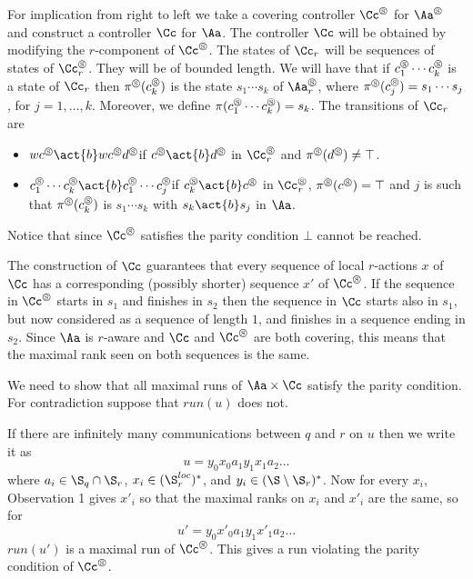 \documentclass[10pt,a4paper]{article}
\newcommand{\run}{\mathit{run}}
\newcommand{\short}[1]{#1^\circledS}
\newcommand{\Sloc}{\S^{loc}}
\begin{document}
  For implication from right to left we take a covering controller $\short \Cc$
  for $\short\Aa$ and construct a controller $\Cc$ for $\Aa$. The
  controller $\Cc$ will be obtained by modifying the $r$-component of
  $\short \Cc$.  The states of $\Cc_r$ will be sequences of states
  of $\short\Cc_r$. They will be of bounded length. We will have that
  if $\short c_1\cdots \short c_k$ is a state of $\Cc_r$ then
  $\short\pi(\short c_k)$ is the state $s_1\cdots s_k$ of $\short\Aa_r$,
  where  $\short\pi(\short c_j)=s_1\cdots
  s_j$, for $j=1,\dots,k$. Moreover, we define $\pi(\short c_1 \cdots
  \short c_k)=s_k$. The transitions of $\Cc_r$ are
  \begin{itemize}
  \item $w\short c \act{b} w\short c \short d $\quad if $\short
    c \act{b} \short d$ in $\short\Cc_r$ and $\short \pi(\short d)\not=\top$. 
  \item $\short c_1\cdots \short c_k \act{b} \short c_1\cdots \short
    c_j$\quad if $\short c_k\act{b}\short c$ in $\short\Cc_r$, $\short
    \pi(\short c)=\top$ and $j$ is such that $\short\pi(\short c_k)$ is
    $s_1\cdots s_k$ with  $s_k\act{b} s_j$ in $\Aa$. 
  \end{itemize}
  Notice that since $\short\Cc$ satisfies the parity condition $\bot$
  cannot be reached.

\medskip

\begin{remark}
The construction of $\Cc$ guarantees that
  every sequence of local $r$-actions $x$ of $\Cc$ has a corresponding
  (possibly shorter) sequence $x'$ of $\short \Cc$. If the sequence in
  $\short\Cc$ starts in $s_1$ and finishes in $s_2$ then the sequence
  in $\Cc$ starts also in $s_1$, but now considered as a sequence of
  length $1$, and finishes in a sequence ending in $s_2$. Since $\Aa$
  is $r$-aware and $\Cc$ and $\short \Cc$ are both covering, this
  means that the maximal rank seen on both sequences is the same.
  
\end{remark}

  We need to show that all maximal runs of $\Aa\times\Cc$ satisfy the
  parity condition. For contradiction suppose that $\run(u)$ does not.

  If there are infinitely many communications between $q$ and $r$ on
  $u$ then we write it as
 \begin{equation}u=y_0x_0a_1y_1x_1a_2\dots
  \end{equation}
  where $a_i\in \S_q \cap \S_r$, $x_i\in (\Sloc_r)^*$, and $y_i\in (\S
  \setminus \S_r)^*$. Now for every $x_i$, Observation 1 gives $x'_i$
  so that the maximal ranks on $x_i$ and $x'_i$ are the same, so for
  \begin{equation}u'=y_0x'_0a_1y_1x'_1a_2\dots
  \end{equation} 
  $\run(u')$ is a maximal run of $\short\Cc$. This gives a run
  violating the parity condition of $\short \Cc$.
\end{document}
